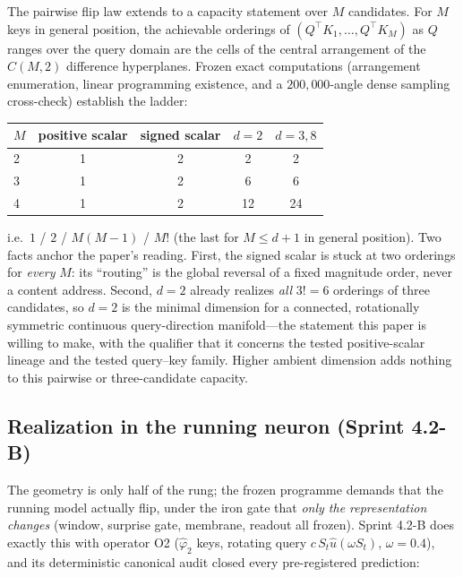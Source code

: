 The pairwise flip law extends to a capacity statement over $M$ candidates.
For $M$ keys in general position, the achievable orderings of
$(Q^{\top}K_1,\ldots,Q^{\top}K_M)$ as $Q$ ranges over the query domain are
the cells of the central arrangement of the $C(M,2)$ difference
hyperplanes. Frozen exact computations (arrangement enumeration, linear
programming existence, and a $200{,}000$-angle dense sampling cross-check)
establish the ladder:

\begin{center}
\begin{tabular}{@{}lcccc@{}}
\toprule
$M$ & positive scalar & signed scalar & $d=2$ & $d=3,8$ \\
\midrule
2 & 1 & 2 & 2 & 2 \\
3 & 1 & 2 & 6 & 6 \\
4 & 1 & 2 & 12 & 24 \\
\bottomrule
\end{tabular}
\end{center}

\noindent i.e.\ $1$ / $2$ / $M(M-1)$ / $M!$ (the last for $M\le d+1$ in
general position). Two facts anchor the paper's reading. First, the signed
scalar is stuck at two orderings for \emph{every} $M$: its ``routing'' is
the global reversal of a fixed magnitude order, never a content address.
Second, $d=2$ already realizes \emph{all} $3!=6$ orderings of three
candidates, so $d=2$ is the minimal dimension for a connected,
rotationally symmetric continuous query-direction manifold---the statement
this paper is willing to make, with the qualifier that it concerns the
tested positive-scalar lineage and the tested query--key family. Higher
ambient dimension adds nothing to this pairwise or three-candidate
capacity.

\subsection{Realization in the running neuron (Sprint 4.2-B)}
\label{sec:realization}

The geometry is only half of the rung; the frozen programme demands that
the running model actually flip, under the iron gate that \emph{only the
representation changes} (window, surprise gate, membrane, readout all
frozen). Sprint 4.2-B does exactly this with operator O2
($\hat\varphi_2$ keys, rotating query $c\,S_t\hat u(\omega S_t)$,
$\omega=0.4$), and its deterministic canonical audit closed every
pre-registered prediction:

